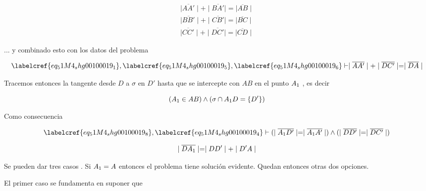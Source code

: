 \begin{equation} \label{eq_51M4_shg00100019_6}
\begin{gathered}
	\mid\overline{AA'}\mid + \mid\overline{BA'}\mid = \mid\overline{AB}\mid \\
	\mid\overline{BB'}\mid + \mid\overline{CB'}\mid = \mid\overline{BC}\mid \\
	\mid\overline{CC'}\mid + \mid\overline{DC'}\mid = \mid\overline{CD}\mid
\end{gathered}
\end{equation}

... y combinado esto con los datos del problema

\begin{equation} \label{eq_51M4_shg00100019_7}
	\labelcref{eq_51M4_shg00100019_1} ,  \labelcref{eq_51M4_shg00100019_5}, \labelcref{eq_51M4_shg00100019_6} \vdash \mid\overline{AA'}\mid + \mid\overline{DC'}\mid = \mid\overline{DA}\mid
\end{equation}

Tracemos entonces la tangente desde $D$ a $\sigma$ en $D'$ hasta que se intercepte con $AB$ en el punto $A\textsubscript{1}$ , es decir

\begin{equation} \label{eq_51M4_shg00100019_8}
	(A\textsubscript{1} \in AB) \land (\sigma \cap A\textsubscript{1}D = \{D'\})\\
\end{equation}

Como consecuencia 

\begin{equation} \label{eq_51M4_shg00100019_9}
\begin{gathered}
	 \labelcref{eq_51M4_shg00100019_8}, \labelcref{eq_51M4_shg00100019_4} \vdash (\mid\overline{A\textsubscript{1}D'}\mid = \mid\overline{A\textsubscript{1}A'}\mid) \land (\mid\overline{DD'}\mid = \mid\overline{DC'}\mid)
\end{gathered}
\end{equation}

\begin{equation} \label{eq_51M4_shg00100019_9a}
	\mid\overline{DA\textsubscript{1}}\mid = \mid DD'\mid + \mid D'A \mid
\end{equation}

Se pueden dar tres casos . Si $A\textsubscript{1} = A$ entonces el problema tiene solución evidente. Quedan entonces otras dos opciones.

El primer caso se fundamenta en suponer que

